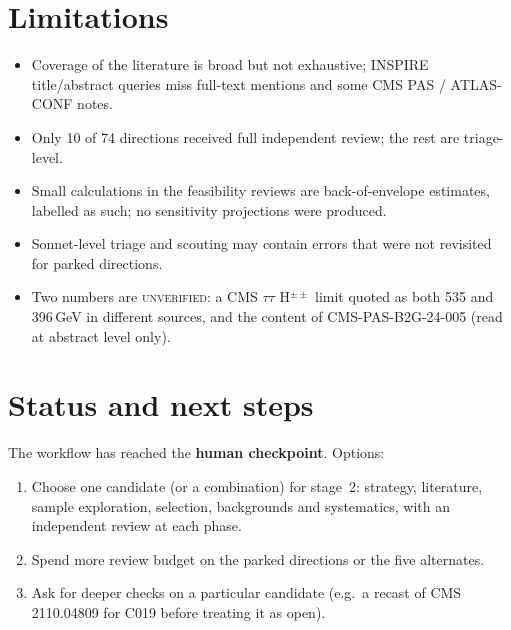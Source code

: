 \documentclass[11pt,a4paper]{article}
\begin{document}
\section{Limitations}
\begin{itemize}
\item Coverage of the literature is broad but not exhaustive; INSPIRE title/abstract queries miss full-text mentions and some CMS PAS / ATLAS-CONF notes.
\item Only 10 of 74 directions received full independent review; the rest are triage-level.
\item Small calculations in the feasibility reviews are back-of-envelope estimates, labelled as such; no sensitivity projections were produced.
\item Sonnet-level triage and scouting may contain errors that were not revisited for parked directions.
\item Two numbers are \textsc{unverified}: a CMS $\tau\tau$ H$^{\pm\pm}$ limit quoted as both 535 and 396\,GeV in different sources, and the content of CMS-PAS-B2G-24-005 (read at abstract level only).
\end{itemize}
\section{Status and next steps}
The workflow has reached the \textbf{human checkpoint}. Options:
\begin{enumerate}
\item Choose one candidate (or a combination) for stage~2: strategy, literature, sample exploration, selection, backgrounds and systematics, with an independent review at each phase.
\item Spend more review budget on the parked directions or the five alternates.
\item Ask for deeper checks on a particular candidate (e.g.\ a recast of CMS 2110.04809 for C019 before treating it as open).
\end{enumerate}
\end{document}
